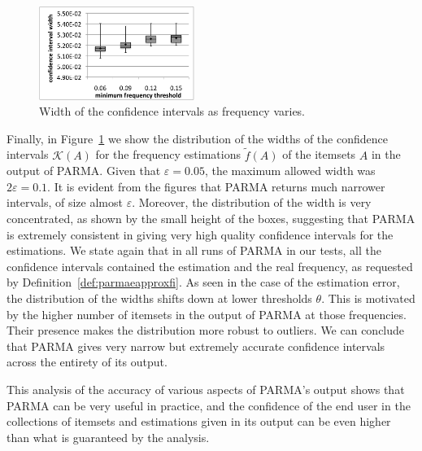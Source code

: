 \begin{figure}[htb]
 \centering
    \includegraphics[width=0.45\textwidth]{parma/confintwidth}
  \caption{Width of the confidence intervals as frequency varies.}
  \label{fig:parmaconfintwidth}
\end{figure}

Finally, in Figure~\ref{fig:parmaconfintwidth} we show the distribution of the widths
of the confidence intervals $\mathcal{K}(A)$ for the frequency estimations
$\tilde{f}(A)$ of the itemsets $A$ in the output of PARMA. Given that
$\varepsilon=0.05$, the maximum allowed width was $2\varepsilon=0.1$. It is
evident from the figures that PARMA returns much narrower intervals, of size almost
$\varepsilon$. Moreover, the distribution of the width is very concentrated, as
shown by the small height of the boxes, suggesting that PARMA is extremely
consistent in giving very high quality confidence intervals for the estimations.
We state again that in all runs of PARMA in our tests, all the confidence
intervals contained the estimation and the real frequency, as requested by
Definition~\ref{def:parmaeapproxfi}. As seen in the case of the estimation
error, the distribution of the widths shifts down at lower thresholds $\theta$.
This is motivated by the higher number of itemsets in the output of PARMA at
those frequencies. Their presence makes the distribution more robust to
outliers. We can conclude that PARMA gives very narrow but
extremely accurate confidence intervals across the entirety of its output.

This analysis of the accuracy of various aspects of PARMA's output shows that
PARMA can be very useful in practice, and the confidence of the end user in
the collections of itemsets and estimations given in its output can be even higher
than what is guaranteed by the analysis.

